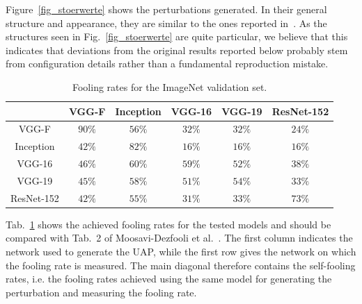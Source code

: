 \documentclass[runningheads]{llncs}
\begin{document}
Figure~\ref{fig_stoerwerte} shows the perturbations generated. In their general structure and appearance, they are similar to the ones reported in~\cite{moosavidezfooli_universal_2017}. As the structures seen in Fig.~\ref{fig_stoerwerte} are quite particular, we believe that this indicates that deviations from the original results reported below probably stem from configuration details rather than a fundamental reproduction mistake.

\begin{table}[htbp]
\centering
\caption{Fooling rates for the ImageNet validation set.}
\begin{tabular}{|c|c|c|c|c|c|}
\hline

			& VGG-F		&	Inception	&	VGG-16		&	VGG-19		&	ResNet-152	\\ \hline
VGG-F		& $90\%$	&	$56\%$		&	$32\%$		&	$32\%$		& 	$24\%$		\\
Inception	& $42\%$	&	$82\%$		&	$16\%$		&	$16\%$		& 	$16\%$	\\
VGG-16		& $46\%$	&	$60\%$		&	$59\%$		&	$52\%$		& 	$38\%$	\\
VGG-19		& $45\%$	&	$58\%$		&	$51\%$		&	$54\%$		& 	$33\%$	\\
ResNet-152	& $42\%$	&	$55\%$		&	$31\%$		&	$33\%$		& 	$73\%$	\\
\hline 
\end{tabular}
\label{tbl_stoerraten_reprod_kreuz_linf}
\end{table}

Tab.~\ref{tbl_stoerraten_reprod_kreuz_linf} shows the achieved fooling rates for the tested models and should be compared with Tab.~2 of Moosavi-Dezfooli et al.~\cite{moosavidezfooli_universal_2017}. The first column indicates the network used to generate the UAP, while the first row gives the network on which the fooling rate is measured. The main diagonal therefore contains the self-fooling rates, i.e. the fooling rates achieved using the same model for generating the perturbation and measuring the fooling rate. 
\end{document}
